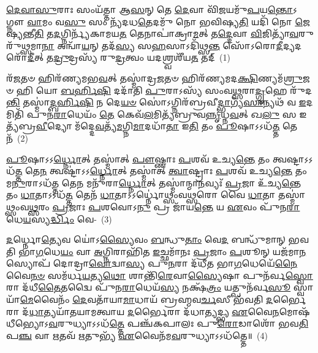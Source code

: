 \setcounter{anuvakam}{0}
\-\ul{𑌦𑍇}\-\-\ul{𑌵𑌾}\-\-\ul{𑌸𑍁}\-𑌰𑌾𑌃 𑌸𑌂𑌯᳴𑌤𑍍𑌤𑌾 𑌆\-\ul{𑌸}\-𑌨𑍍 𑌤𑍇 \ul{𑌦𑍇}\-𑌵𑌾 𑌵𑌿᳴\-\ul{𑌜}\-𑌯𑌮𑍁᳴\-\ul{𑌪}\-𑌯\-\ul{𑌨𑍍𑌤𑍋}\-\-𑌽𑌗𑍍𑌨𑍗 \ul{𑌵𑌾}\-𑌮𑌂 𑌵\-\ul{𑌸𑍁} 𑌸𑌂 𑌨𑍍𑌯᳴𑌦𑌧\-\ul{𑌤𑍇}\-𑌦𑌮𑍁᳴ 𑌨𑍋 𑌭𑌵𑌿𑌷𑍍𑌯\-\ul{𑌤𑌿} 𑌯𑌦𑌿᳴ 𑌨𑍋 \ul{𑌜𑍇}\-𑌷𑍍𑌯𑌨𑍍𑌤𑍀\-\ul{𑌤𑌿} 𑌤\-\ul{𑌦}\-𑌗𑍍𑌨𑌿𑌰𑍍𑌨𑍍𑌯᳴𑌕𑌾𑌮𑌯\-\ul{𑌤} 𑌤𑍇𑌨𑌾𑌪𑌾॑𑌕𑍍𑌰𑌾\-\ul{𑌮}\-𑌤𑍍 𑌤\-\ul{𑌦𑍍𑌦𑍇}\-𑌵𑌾 \ul{𑌵𑌿}\-𑌜𑌿𑌤𑍍𑌯𑌾᳴\-\ul{𑌵}\-𑌰𑍁𑌰𑍁᳴𑌥𑍍𑌸𑌮𑌾\-\ul{𑌨𑌾} 𑌅𑌨𑍍𑌵𑌾᳴\-\ul{𑌯}\-𑌨𑍍 𑌤𑌦᳴\-\ul{𑌸𑍍𑌯} 𑌸\-\ul{𑌹}\-𑌸𑌾\-𑌽𑌦𑌿᳴𑌥𑍍𑌸\-\ul{𑌨𑍍𑌤} 𑌸𑍋᳴\-𑌽𑌰𑍋\-\ul{𑌦𑍀}\-𑌦𑍍𑌯𑌦𑌰𑍋᳴\-\ul{𑌦𑍀}\-𑌤𑍍 𑌤\-\ul{𑌦𑍍𑌰𑍁}\-𑌦𑍍𑌰𑌸𑍍𑌯᳴ 𑌰𑍁\-\ul{𑌦𑍍𑌰}\-𑌤𑍍𑌵𑌂 𑌯𑌦𑌶𑍍𑌰𑍍𑌵𑌶𑍀᳴𑌯\-\ul{𑌤} 𑌤𑌦𑍍~(1)

𑌰᳴\-\ul{𑌜}\-𑌤𑍞 𑌹𑌿𑌰᳴𑌣𑍍𑌯𑌮𑌭\-\ul{𑌵}\-𑌤𑍍 𑌤𑌸𑍍𑌮𑌾॑𑌦𑍍𑌰\-\ul{𑌜}\-𑌤𑍞 𑌹𑌿𑌰᳴𑌣𑍍𑌯𑌮𑌦\-\ul{𑌕𑍍𑌷𑌿}\-𑌣𑍍𑌯\-𑌮᳴\-\ul{𑌶𑍍𑌰𑍁}\-𑌜𑍞 𑌹𑌿 𑌯𑍋 \ul{𑌬}\-\-\ul{𑌰𑍍}\-\mbox{}𑌹𑌿\-\ul{𑌷𑌿} 𑌦𑌦𑌾᳴𑌤𑌿 \ul{𑌪𑍁}\-𑌰𑌾\-𑌽𑌸𑍍𑌯᳴ 𑌸𑌂𑌵\-\ul{𑌥𑍍𑌸}\-𑌰𑌾\-\ul{𑌦𑍍𑌗𑍃}\-𑌹𑍇 𑌰𑍁᳴𑌦\-\ul{𑌨𑍍𑌤𑌿} 𑌤𑌸𑍍𑌮𑌾॑\-\ul{𑌦𑍍𑌬}\-\-\ul{𑌰𑍍}\-\mbox{}𑌹𑌿\-\ul{𑌷𑌿} 𑌨 𑌦𑍇\-\ul{𑌯}\-\-\ul{𑍞} 𑌸𑍋॑\-𑌽𑌗𑍍𑌨𑌿𑌰᳴𑌬𑍍𑌰𑌵𑍀\-\ul{𑌦𑍍𑌭𑌾}\-𑌗𑍍𑌯᳴\-\ul{𑌸𑌾}\-𑌨𑍍𑌯𑌥᳴ 𑌵 \ul{𑌇}\-𑌦𑌮𑌿𑌤𑌿᳴ 𑌪𑍁𑌨\-\ul{𑌰𑌾}\-𑌧𑍇𑌯𑌂᳴ \ul{𑌤𑍇} 𑌕𑍇𑌵᳴\-\ul{𑌲}\-𑌮𑌿𑌤𑍍𑌯᳴𑌬𑍍𑌰𑍁𑌵\-\ul{𑌨𑍍𑌨𑍃}\-𑌧𑍍𑌨\-\ul{𑌵}\-𑌤𑍍 𑌖\-\ul{𑌲𑍁} 𑌸 𑌇𑌤𑍍𑌯᳴𑌬𑍍𑌰\-\ul{𑌵𑍀}\-𑌦𑍍𑌯𑍋 𑌮᳴𑌦𑍍𑌦𑍇\-\ul{𑌵}\-𑌤𑍍𑌯᳴\-\ul{𑌮}\-𑌗𑍍𑌨𑌿\-\ul{𑌮𑌾}\-𑌦𑌧𑌾᳴\-\ul{𑌤𑌾} 𑌇\-\ul{𑌤𑌿} 𑌤𑌂 \ul{𑌪𑍂}\-𑌷𑌾\-𑌽\-𑌽𑌧᳴\-\ul{𑌤𑍍𑌤} 𑌤𑍇𑌨᳴~(2)

\-\ul{𑌪𑍂}\-𑌷𑌾\-𑌽\-𑌽\-\ul{𑌰𑍍𑌧𑍍𑌨𑍋}\-𑌤𑍍 𑌤𑌸𑍍𑌮𑌾॑𑌤𑍍 \ul{𑌪𑍗}\-𑌷𑍍𑌣𑌾𑌃 \ul{𑌪}\-𑌶𑌵᳴ 𑌉𑌚𑍍𑌯\-\ul{𑌨𑍍𑌤𑍇} 𑌤𑌂 𑌤𑍍𑌵𑌷𑍍𑌟𑌾\-𑌽\-𑌽𑌧᳴\-\ul{𑌤𑍍𑌤} 𑌤𑍇\-\ul{𑌨} 𑌤𑍍𑌵𑌷𑍍𑌟𑌾॑\-𑌽\-𑌽\-\ul{𑌰𑍍𑌧𑍍𑌨𑍋}\-𑌤𑍍 𑌤𑌸𑍍𑌮𑌾॑𑌤𑍍 \ul{𑌤𑍍𑌵𑌾}\-𑌷𑍍𑌟𑍍𑌰𑌾𑌃 \ul{𑌪}\-𑌶𑌵᳴ 𑌉𑌚𑍍𑌯\-\ul{𑌨𑍍𑌤𑍇} 𑌤𑌂 𑌮\-\ul{𑌨𑍁}\-𑌰𑌾\-𑌽𑌧᳴\-\ul{𑌤𑍍𑌤} 𑌤𑍇\-\ul{𑌨} 𑌮𑌨𑍁᳴𑌰𑌾\-\ul{𑌰𑍍𑌧𑍍𑌨𑍋}\-𑌤𑍍 𑌤𑌸𑍍𑌮𑌾॑𑌨𑍍𑌮𑌾\-\ul{𑌨}\-𑌵𑍍𑌯𑌃᳴ \ul{𑌪𑍍𑌰}\-𑌜𑌾 𑌉᳴𑌚𑍍𑌯\-\ul{𑌨𑍍𑌤𑍇} 𑌤𑌂 \ul{𑌧𑌾}\-𑌤𑌾\-𑌽\-𑌽𑌧᳴\-\ul{𑌤𑍍𑌤} 𑌤𑍇𑌨᳴ \ul{𑌧𑌾}\-𑌤𑌾\-𑌽\-𑌽𑌰𑍍𑌧𑍍𑌨𑍋॑𑌥𑍍𑌸𑌂𑌵\-\ul{𑌥𑍍𑌸}\-𑌰𑍋 𑌵𑍈 \ul{𑌧𑌾}\-𑌤𑌾 𑌤𑌸𑍍𑌮𑌾॑𑌥𑍍𑌸𑌂𑌵\-\ul{𑌥𑍍𑌸}\-𑌰𑌂 \ul{𑌪𑍍𑌰}\-𑌜𑌾𑌃 \ul{𑌪}\-𑌶𑌵𑍋\-𑌽\-\ul{𑌨𑍁} 𑌪𑍍𑌰 𑌜𑌾᳴𑌯\-\ul{𑌨𑍍𑌤𑍇} 𑌯 \ul{𑌏}\-𑌵𑌂 𑌪𑍁᳴𑌨\-\ul{𑌰𑌾}\-𑌧𑍇\-\ul{𑌯}\-𑌸𑍍𑌯\-\ul{𑌰𑍍𑌦𑍍𑌧𑌿𑌂} 𑌵𑍇-~(3)

\-\ul{𑌦}\-𑌰𑍍𑌧𑍍𑌨𑍋\-\ul{𑌤𑍍𑌯𑍇}\-𑌵 𑌯𑍋॑\-𑌽\-\ul{𑌸𑍍𑌯𑍈}\-𑌵𑌂 \ul{𑌬}\-𑌨𑍍𑌧𑍁\-\ul{𑌤𑌾𑌂} 𑌵𑍇\-\ul{𑌦} 𑌬𑌨𑍍𑌧𑍁᳴𑌮𑌾𑌨𑍍 𑌭𑌵𑌤𑌿 𑌭𑌾\-\ul{𑌗}\-𑌧𑍇\-\ul{𑌯𑌂} 𑌵𑌾 \ul{𑌅}\-𑌗𑍍𑌨𑌿𑌰𑌾𑌹𑌿᳴𑌤 \ul{𑌇}\-𑌚𑍍𑌛𑌮𑌾᳴𑌨𑌃 \ul{𑌪𑍍𑌰}\-𑌜𑌾𑌂 \ul{𑌪}\-𑌶𑍂𑌨𑍍 𑌯𑌜᳴𑌮𑌾\-\ul{𑌨}\-𑌸𑍍𑌯𑍋𑌪᳴ 𑌦𑍋𑌦𑍍𑌰𑌾\-\ul{𑌵𑍋}\-𑌦𑍍𑌵𑌾\-\ul{𑌸𑍍𑌯} 𑌪𑍁\-\ul{𑌨}\-𑌰𑌾 𑌦᳴𑌧𑍀𑌤 𑌭𑌾\-\ul{𑌗}\-𑌧𑍇𑌯𑍇᳴\-\ul{𑌨𑍈}\-𑌵𑍈\-\ul{𑌨}\-\-\ul{𑍞} 𑌸𑌮᳴𑌰𑍍𑌧\-\ul{𑌯}\-𑌤𑍍𑌯\-\ul{𑌥𑍋} 𑌶𑌾𑌨𑍍𑌤𑌿᳴\-\ul{𑌰𑍇}\-𑌵𑌾\-\ul{𑌸𑍍𑌯𑍈}\-𑌷𑌾 𑌪𑍁𑌨᳴𑌰𑍍𑌵\-\ul{𑌸𑍍𑌵𑍋}\-𑌰𑌾 𑌦᳴𑌧𑍀\-\ul{𑌤𑍈}\-𑌤𑌦𑍍𑌵𑍈 𑌪𑍁᳴𑌨\-\ul{𑌰𑌾}\-𑌧𑍇𑌯᳴\-\ul{𑌸𑍍𑌯} 𑌨𑌕𑍍𑌷᳴\-\ul{𑌤𑍍𑌰𑌂} 𑌯𑌤𑍍𑌪𑍁𑌨᳴𑌰𑍍𑌵\-\ul{𑌸𑍂} 𑌸𑍍𑌵𑌾𑌯𑌾᳴\-\ul{𑌮𑍇}\-𑌵𑍈𑌨𑌂᳴ \ul{𑌦𑍇}\-𑌵𑌤𑌾᳴𑌯𑌾\-\ul{𑌮𑌾}\-𑌧𑌾𑌯᳴ 𑌬𑍍𑌰𑌹𑍍𑌮𑌵\-\ul{𑌰𑍍𑌚}\-𑌸𑍀 𑌭᳴𑌵𑌤𑌿 \ul{𑌦}\-𑌰𑍍𑌭𑍈𑌰𑌾 𑌦᳴\-\ul{𑌧𑌾}\-𑌤𑍍𑌯𑌯𑌾᳴𑌤𑌯𑌾𑌮𑌤𑍍𑌵𑌾𑌯 \ul{𑌦}\-𑌰𑍍𑌭𑍈𑌰𑌾 𑌦᳴𑌧𑌾\-\ul{𑌤𑍍𑌯}\-𑌦𑍍𑌭𑍍𑌯 \ul{𑌏}\-𑌵𑍈\-\ul{𑌨}\-𑌮𑍋𑌷᳴𑌧𑍀𑌭𑍍𑌯𑍋\-𑌽\-\ul{𑌵}\-𑌰𑍁𑌧𑍍𑌯𑌾\-𑌽\-𑌽𑌧᳴\-\ul{𑌤𑍍𑌤𑍇} 𑌪𑌞𑍍𑌚᳴𑌕𑌪𑌾𑌲𑌃 𑌪𑍁\-\ul{𑌰𑍋}\-𑌡𑌾𑌶𑍋᳴ 𑌭𑌵\-\ul{𑌤𑌿} 𑌪\-\ul{𑌞𑍍𑌚} 𑌵𑌾 \ul{𑌋}\-𑌤𑌵᳴ \ul{𑌋}\-𑌤𑍁𑌭𑍍𑌯᳴ \ul{𑌏}\-𑌵𑍈𑌨᳴𑌮\-\ul{𑌵}\-𑌰𑍁𑌧𑍍𑌯𑌾\-𑌽\-𑌽𑌧᳴𑌤𑍍𑌤𑍇॥~(4)

